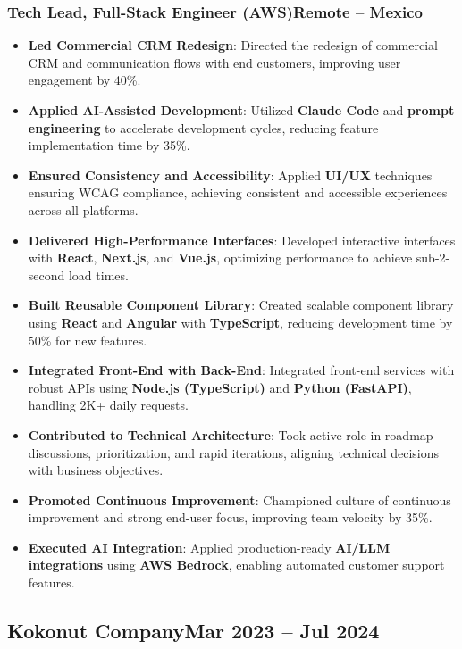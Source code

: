 \documentclass[a4paper,10pt]{article}
\newcommand{\kw}[1]{\textbf{\textcolor{keyword}{#1}}}
\newcommand{\tech}[1]{\textbf{\textcolor{tech}{#1}}}
\begin{document}
\subsubsection*{\small Tech Lead, Full-Stack Engineer (AWS)\hfill Remote -- Mexico}
\begin{itemize}[noitemsep, leftmargin=*]
    \item \textbf{Led Commercial CRM Redesign}: Directed the redesign of commercial CRM and communication flows with end customers, improving user engagement by 40\%.
    \item \textbf{Applied AI-Assisted Development}: Utilized \kw{Claude Code} and \kw{prompt engineering} to accelerate development cycles, reducing feature implementation time by 35\%.
    \item \textbf{Ensured Consistency and Accessibility}: Applied \kw{UI/UX} techniques ensuring WCAG compliance, achieving consistent and accessible experiences across all platforms.
    \item \textbf{Delivered High-Performance Interfaces}: Developed interactive interfaces with \tech{React}, \tech{Next.js}, and \tech{Vue.js}, optimizing performance to achieve sub-2-second load times.
    \item \textbf{Built Reusable Component Library}: Created scalable component library using \tech{React} and \tech{Angular} with \tech{TypeScript}, reducing development time by 50\% for new features.
    \item \textbf{Integrated Front-End with Back-End}: Integrated front-end services with robust APIs using \tech{Node.js (TypeScript)} and \tech{Python (FastAPI)}, handling 2K+ daily requests.
    \item \textbf{Contributed to Technical Architecture}: Took active role in roadmap discussions, prioritization, and rapid iterations, aligning technical decisions with business objectives.
    \item \textbf{Promoted Continuous Improvement}: Championed culture of continuous improvement and strong end-user focus, improving team velocity by 35\%.
    \item \textbf{Executed AI Integration}: Applied production-ready \kw{AI/LLM integrations} using \tech{AWS Bedrock}, enabling automated customer support features.
\end{itemize}

\subsection*{\small Kokonut Company\hfill\textbf{Mar 2023 -- Jul 2024}}
\end{document}
